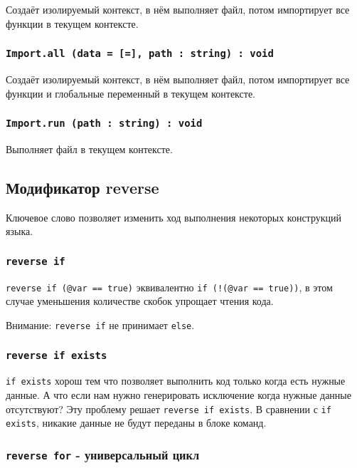 Создаёт изолируемый контекст, в нём выполняет файл, потом импортирует все функции в текущем контексте.

\subsubsection{\lstinline|Import.all (data = [=], path : string) : void|}

Создаёт изолируемый контекст, в нём выполняет файл, потом импортирует все функции и глобальные переменный в текущем контексте.

\subsubsection{\lstinline|Import.run (path : string) : void|}

Выполняет файл в текущем контексте.

\subsection{Модификатор {\color{blue2} reverse}}

Ключевое слово  позволяет изменить ход выполнения некоторых конструкций языка.

\subsubsection{\lstinline|reverse if|}

\lstinline|reverse if (@var == true)| эквивалентно \lstinline|if (!(@var == true))|, в этом случае уменьшения количестве скобок упрощает чтения кода. 

Внимание: \lstinline|reverse if| не принимает \lstinline|else|.

\subsubsection{\lstinline|reverse if exists|}

\lstinline|if exists| хорош тем что позволяет выполнить код только когда есть нужные данные. А что если нам нужно генерировать исключение когда нужные данные отсутствуют? Эту проблему решает \lstinline|reverse if exists|. В сравнении с \lstinline|if exists|, никакие данные не будут переданы в блоке команд.

\subsubsection{\lstinline|reverse for| - универсальный цикл}

